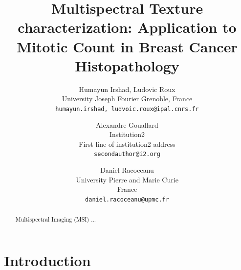 \documentclass[10pt,twocolumn,letterpaper]{article}
\begin{document}
\title{Multispectral Texture characterization: Application to Mitotic Count in Breast Cancer Histopathology}

\author{Humayun Irshad, Ludovic Roux\\
University Joseph Fourier Grenoble, France\\
{\tt\small {humayun.irshad, ludvoic.roux}@ipal.cnrs.fr} \\
\and 
Alexandre Gouallard\\
Institution2\\
First line of institution2 address\\
{\tt\small secondauthor@i2.org} \\
\and
Daniel Racoceanu\\
University Pierre and Marie Curie\\
France\\
{\tt\small daniel.racoceanu@upmc.fr}
}

\maketitle

\begin{abstract}
Multispectral Imaging (MSI) ...
\end{abstract}

\section{Introduction}
\end{document}
